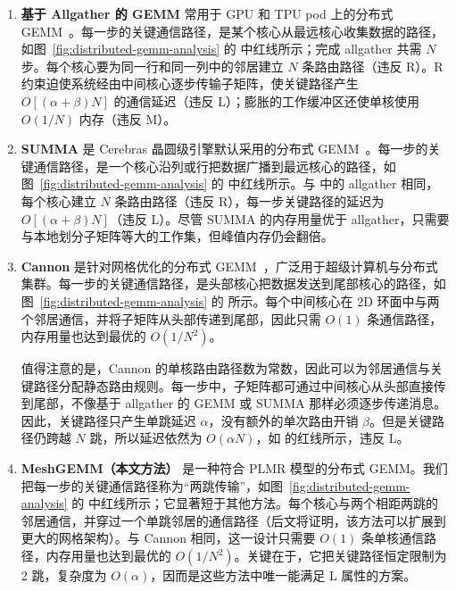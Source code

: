 \begin{enumerate}[label=(\arabic*),leftmargin=0.5cm,noitemsep,topsep=0pt]
\item \textbf{基于 Allgather 的 GEMM} 常用于 GPU 和 TPU pod 上的分布式 GEMM~\cite{google2023efficiently,tensorrt-llm,megatron}。每一步的关键通信路径，是某个核心从最远核心收集数据的路径，如图~\ref{fig:distributed-gemm-analysis} 的  中红线所示；完成 allgather 共需 $N$ 步。每个核心要为同一行和同一列中的邻居建立 $N$ 条路由路径（违反 R）。R 约束迫使系统经由中间核心逐步传输子矩阵，使关键路径产生 $O[(\alpha+\beta)N]$ 的通信延迟（违反 L）；膨胀的工作缓冲区还使单核使用 $O(1/N)$ 内存（违反 M）。

\item \textbf{SUMMA} 是 Cerebras 晶圆级引擎默认采用的分布式 GEMM~\cite{cerebrasgemm}。每一步的关键通信路径，是一个核心沿列或行把数据广播到最远核心的路径，如图~\ref{fig:distributed-gemm-analysis} 的  中红线所示。与  中的 allgather 相同，每个核心建立 $N$ 条路由路径（违反 R），每一步关键路径的延迟为 $O[(\alpha+\beta)N]$（违反 L）。尽管 SUMMA 的内存用量优于 allgather，只需要与本地划分子矩阵等大的工作集，但峰值内存仍会翻倍。

\item \textbf{Cannon} 是针对网格优化的分布式 GEMM~\cite{cannon}，广泛用于超级计算机与分布式集群。每一步的关键通信路径，是头部核心把数据发送到尾部核心的路径，如图~\ref{fig:distributed-gemm-analysis} 的  所示。每个中间核心在 2D 环面中与两个邻居通信，并将子矩阵从头部传递到尾部，因此只需 $O(1)$ 条通信路径，内存用量也达到最优的 $O(1/N^2)$。

值得注意的是，Cannon 的单核路由路径数为常数，因此可以为邻居通信与关键路径分配静态路由规则。每一步中，子矩阵都可通过中间核心从头部直接传到尾部，不像基于 allgather 的 GEMM 或 SUMMA 那样必须逐步传递消息。因此，关键路径只产生单跳延迟 $\alpha$，没有额外的单次路由开销 $\beta$。但是关键路径仍跨越 $N$ 跳，所以延迟依然为 $O(\alpha N)$，如  的红线所示，违反 L。

\item \textbf{MeshGEMM（本文方法）} 是一种符合 PLMR 模型的分布式 GEMM。我们把每一步的关键通信路径称为“两跳传输”，如图~\ref{fig:distributed-gemm-analysis} 的  中红线所示；它显著短于其他方法。每个核心与两个相距两跳的邻居通信，并穿过一个单跳邻居的通信路径（后文将证明，该方法可以扩展到更大的网格架构）。与 Cannon 相同，这一设计只需要 $O(1)$ 条单核通信路径，内存用量也达到最优的 $O(1/N^2)$。关键在于，它把关键路径恒定限制为 2 跳，复杂度为 $O(\alpha)$，因而是这些方法中唯一能满足 L 属性的方案。
\end{enumerate}

